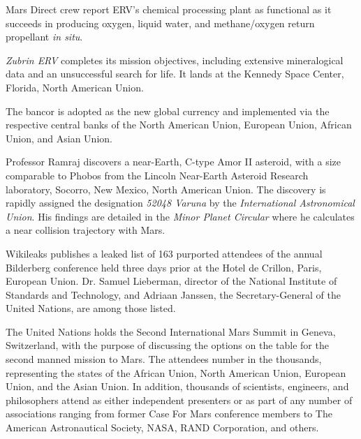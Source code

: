 Mars Direct crew report ERV's chemical processing plant as functional as it succeeds in producing oxygen, liquid water, and methane/oxygen return propellant {\it in situ}.
\StopTimelineDate

{\it Zubrin ERV} completes its mission objectives, including extensive mineralogical data and an unsuccessful search for life. It lands at the Kennedy Space Center, Florida, North American Union.
\StopTimelineDate

The bancor is adopted as the new global currency and implemented via the respective central banks of the North American Union, European Union, African Union, and Asian Union.
\StopTimelineDate

Professor Ramraj discovers a near-Earth, C-type Amor II asteroid, with a size comparable to Phobos from the Lincoln Near-Earth Asteroid Research laboratory, Socorro, New Mexico, North American Union. The discovery is rapidly assigned the designation {\it 52048 Varuna} by the {\it International Astronomical Union}. His findings are detailed in the {\it Minor Planet Circular} where he calculates a near collision trajectory with Mars.
\StopTimelineDate

Wikileaks publishes a leaked list of 163 purported attendees of the annual Bilderberg conference held three days prior at the Hotel de Crillon, Paris, European Union. Dr. Samuel Lieberman, director of the National Institute of Standards and Technology, and Adriaan Janssen, the Secretary-General of the United Nations, are among those listed.
\StopTimelineDate

The United Nations holds the Second International Mars Summit in Geneva, Switzerland, with the purpose of discussing the options on the table for the second manned mission to Mars. The attendees number in the thousands, representing the states of the African Union, North American Union, European Union, and the Asian Union. In addition, thousands of scientists, engineers, and philosophers attend as either independent presenters or as part of any number of associations ranging from former Case For Mars conference members to The American Astronautical Society, NASA, RAND Corporation, and others.

